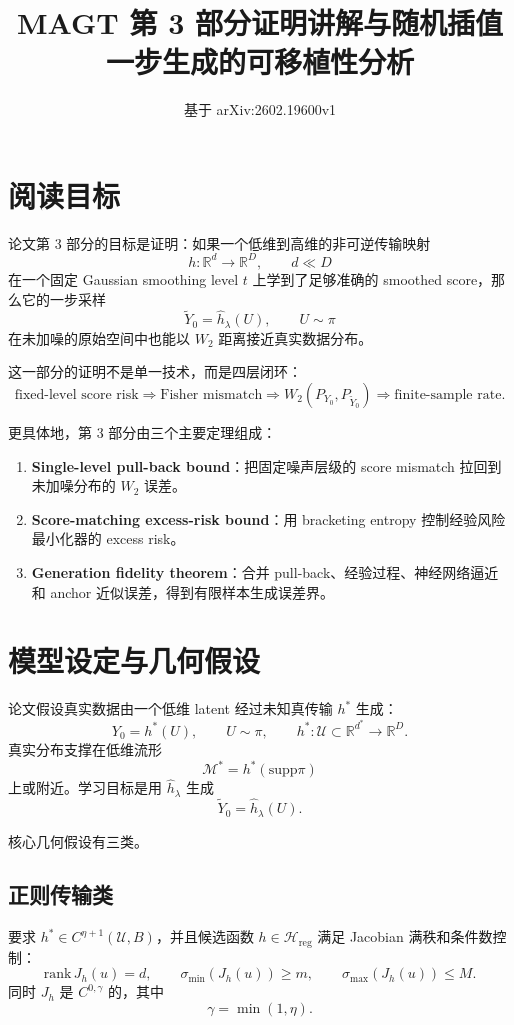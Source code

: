 \documentclass[UTF8,11pt]{ctexart}
\title{MAGT 第 3 部分证明讲解与随机插值一步生成的可移植性分析}
\author{}
\date{基于 arXiv:2602.19600v1}
\newcommand{\R}{\mathbb{R}}
\newcommand{\cH}{\mathcal{H}}
\newcommand{\cU}{\mathcal{U}}
\newcommand{\cM}{\mathcal{M}}
\newcommand{\supp}{\mathrm{supp}}
\begin{document}
\maketitle

\section{阅读目标}

论文第 3 部分的目标是证明：如果一个低维到高维的非可逆传输映射
\[
h:\R^d\to\R^D,\qquad d\ll D
\]
在一个固定 Gaussian smoothing level \(t\) 上学到了足够准确的 smoothed score，那么它的一步采样
\[
\widetilde Y_0=\hat h_\lambda(U),\qquad U\sim\pi
\]
在未加噪的原始空间中也能以 \(W_2\) 距离接近真实数据分布。

这一部分的证明不是单一技术，而是四层闭环：
\[
\text{fixed-level score risk}
\Longrightarrow
\text{Fisher mismatch}
\Longrightarrow
W_2(P_{Y_0},P_{\widetilde Y_0})
\Longrightarrow
\text{finite-sample rate}.
\]

更具体地，第 3 部分由三个主要定理组成：
\begin{enumerate}
\item \textbf{Single-level pull-back bound}：把固定噪声层级的 score mismatch 拉回到未加噪分布的 \(W_2\) 误差。
\item \textbf{Score-matching excess-risk bound}：用 bracketing entropy 控制经验风险最小化器的 excess risk。
\item \textbf{Generation fidelity theorem}：合并 pull-back、经验过程、神经网络逼近和 anchor 近似误差，得到有限样本生成误差界。
\end{enumerate}

\section{模型设定与几何假设}

论文假设真实数据由一个低维 latent 经过未知真传输 \(h^*\) 生成：
\[
Y_0=h^*(U),\qquad U\sim\pi,\qquad h^*:\cU\subset\R^{d^*}\to\R^D.
\]
真实分布支撑在低维流形
\[
\cM^*=h^*(\supp\pi)
\]
上或附近。学习目标是用 \(\hat h_\lambda\) 生成
\[
\widetilde Y_0=\hat h_\lambda(U).
\]

核心几何假设有三类。

\subsection{正则传输类}

要求 \(h^*\in C^{\eta+1}(\cU,B)\)，并且候选函数 \(h\in\cH_{\mathrm{reg}}\) 满足 Jacobian 满秩和条件数控制：
\[
\mathrm{rank}\,J_h(u)=d,\qquad
\sigma_{\min}(J_h(u))\ge m,\qquad
\sigma_{\max}(J_h(u))\le M.
\]
同时 \(J_h\) 是 \(C^{0,\gamma}\) 的，其中
\[
\gamma=\min(1,\eta).
\]
\end{document}
